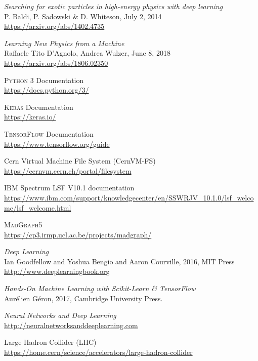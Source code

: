 \begin{thebibliography}{99}
\textit{Searching for exotic particles in high-energy physics with deep learning}
\\P. Baldi, P. Sadowski \& D. Whiteson, July 2, 2014
\\\url{https://arxiv.org/abs/1402.4735}

\textit{Learning New Physics from a Machine}
\\Raffaele Tito D'Agnolo, Andrea Wulzer, June 8, 2018
\\\url{https://arxiv.org/abs/1806.02350}

\textsc{Python 3} Documentation
\\\url{https://docs.python.org/3/}

\textsc{Keras} Documentation 
\\\url{https://keras.io/}
 
\textsc{TensorFlow} Documentation 
\\\url{https://www.tensorflow.org/guide}

Cern Virtual Machine File System (CernVM-FS)
\\\url{https://cernvm.cern.ch/portal/filesystem}

IBM Spectrum LSF V10.1 documentation
\\\url{https://www.ibm.com/support/knowledgecenter/en/SSWRJV_10.1.0/lsf_welcome/lsf_welcome.html}

\textsc{MadGraph5}
\\\url{https://cp3.irmp.ucl.ac.be/projects/madgraph/}
 
\textit{Deep Learning}
\\Ian Goodfellow and Yoshua Bengio and Aaron Courville, 2016, MIT Press
\\\url{http://www.deeplearningbook.org}

\textit{Hands-On Machine Learning with Scikit-Learn \& TensorFlow}
\\Aurélien Géron, 2017, Cambridge University Press.

\textit{Neural Networks and Deep Learning}
\\\url{http://neuralnetworksanddeeplearning.com}

Large Hadron Collider (LHC)
\\\url{https://home.cern/science/accelerators/large-hadron-collider}


\end{thebibliography}

